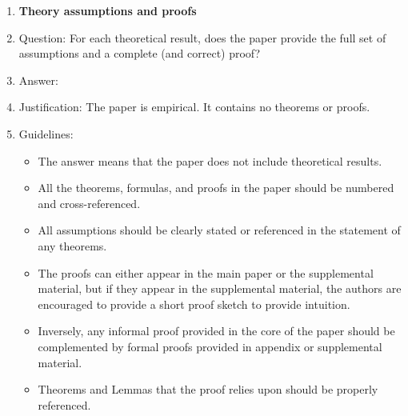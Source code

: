 \begin{enumerate}
\item {\bf Theory assumptions and proofs}
    \item[] Question: For each theoretical result, does the paper provide the full set of assumptions and a complete (and correct) proof?
    \item[] Answer: \answerNA{}
    \item[] Justification: The paper is empirical. It contains no theorems or proofs.
    \item[] Guidelines:
    \begin{itemize}
        \item The answer \answerNA{} means that the paper does not include theoretical results.
        \item All the theorems, formulas, and proofs in the paper should be numbered and cross-referenced.
        \item All assumptions should be clearly stated or referenced in the statement of any theorems.
        \item The proofs can either appear in the main paper or the supplemental material, but if they appear in the supplemental material, the authors are encouraged to provide a short proof sketch to provide intuition.
        \item Inversely, any informal proof provided in the core of the paper should be complemented by formal proofs provided in appendix or supplemental material.
        \item Theorems and Lemmas that the proof relies upon should be properly referenced.
    \end{itemize}


\end{enumerate}
